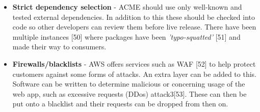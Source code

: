 \begin{itemize}
    \item \textbf{Strict dependency selection} - ACME should use only well-known and tested external dependencies. In addition to this these should be checked
    into code so other developers can review them before live release. There have been multiple instances [50] where packages have been 
    \textit{'typo-squatted'} [51] and made their way to consumers.
    
    \item \textbf{Firewalls/blacklists} - AWS offers services such as WAF [52] to help protect customers against some forms of attacks. An extra layer can be 
    added to this. Software can be written to determine malicious or concerning usage of the web app, such as excessive requests (DDos) attack3[53]. 
    These can then be put onto a blacklist and their requests can be dropped from then on.
  \end{itemize}

\newpage
